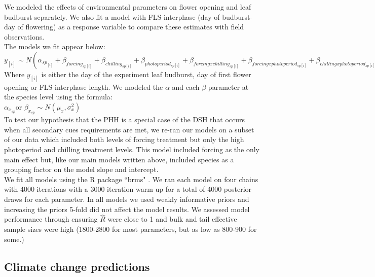 \documentclass[11pt]{article}\usepackage[]{graphicx}\usepackage[]{color}
\begin{document}
\noident We modeled the effects of environmental parameters on flower opening and leaf budburst separately. We also fit a model with FLS interphase (day of budburst- day of flowering) as a response variable to compare these estimates with field observations.\\

The models we fit appear below:\\

$y_{[i]} \sim N(\alpha_{sp_{[i]}}+\beta_{forcing_{sp[i]}}+\beta_{chilling_{sp[i]}}+\beta_{photoperiod_{sp[i]}}+\beta_{forcing x chilling_{sp[i]}}+\beta_{forcing x photoperiod_{sp[i]}}+\beta_{chilling x photoperiod_{sp[i]}})$\\

Where $y_{[i]}$ is either the day of the experiment leaf budburst, day of first flower opening or FLS interphase length.  We modeled the $\alpha$ and each $\beta$ parameter at the species level using the formula:\\

$\alpha_{x_{sp}} $or $\beta_{x_{sp}} \sim N(\mu_x,\sigma^2_x)$\\

\noindent To test our hypothesis that the PHH is a special case of the DSH that occurs when all secondary cues requirements are met, we re-ran our models on a subset of our data which included both levels of forcing treatment but only the high photoperiod and chilling treatment levels. This model included forcing as the only main effect but, like our main models written above, included species as a grouping factor on the model slope and intercept.\\ 

\noindent We fit all models using the R package ``brms" \citep{Burkner2018}. We ran each model on four chains with 4000 iterations with a 3000 iteration warm up for a total of 4000 posterior draws for each parameter. In all models we used weakly informative priors and increasing the priors 5-fold did not affect the model results. We assessed  model performance through ensuring $\hat{R}$ were close to 1 and bulk and tail effective sample sizes were high (1800-2800 for most parameters, but as low as  800-900 for some.)\\

\subsection*{Climate change predictions}
\end{document}
